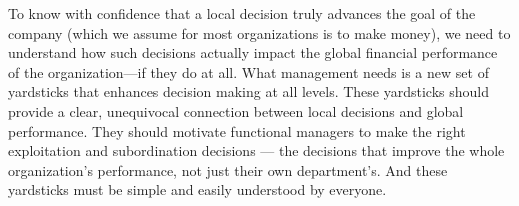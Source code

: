 To know with confidence that a local decision truly advances the goal of
the company (which we assume for most organizations is to
make money), we need to understand how such decisions actually impact
the global financial performance of the organization---if they do at all. What
management needs is a new set of yardsticks that enhances decision making
at all levels. These yardsticks should provide a clear, unequivocal connection
between local decisions and global performance. They should motivate functional
managers to make the right exploitation and subordination decisions
--- the decisions that improve the whole organization’s performance, not just
their own department’s. And these yardsticks must be simple and easily
understood by everyone.






